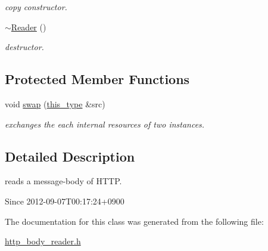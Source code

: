 \begin{DoxyCompactItemize}
\begin{DoxyCompactList}\small\item\em copy constructor. \end{DoxyCompactList}\item 
\hypertarget{classhryky_1_1http_1_1body_1_1_reader_af61ffe0181b1f2c24cec9befcf46b793}{\hyperlink{classhryky_1_1http_1_1body_1_1_reader_af61ffe0181b1f2c24cec9befcf46b793}{$\sim$\-Reader} ()}\label{classhryky_1_1http_1_1body_1_1_reader_af61ffe0181b1f2c24cec9befcf46b793}

\begin{DoxyCompactList}\small\item\em destructor. \end{DoxyCompactList}\end{DoxyCompactItemize}
\subsection*{Protected Member Functions}
\begin{DoxyCompactItemize}
\item 
\hypertarget{classhryky_1_1http_1_1body_1_1_reader_a9c6a58755c47e91cbe61085af6c54144}{void \hyperlink{classhryky_1_1http_1_1body_1_1_reader_a9c6a58755c47e91cbe61085af6c54144}{swap} (\hyperlink{classhryky_1_1http_1_1body_1_1_reader_ab81eae48a1c2e78cf613bffd7180400c}{this\-\_\-type} \&src)}\label{classhryky_1_1http_1_1body_1_1_reader_a9c6a58755c47e91cbe61085af6c54144}

\begin{DoxyCompactList}\small\item\em exchanges the each internal resources of two instances. \end{DoxyCompactList}\end{DoxyCompactItemize}


\subsection{Detailed Description}
reads a message-\/body of H\-T\-T\-P. 

\begin{DoxySince}{Since}
2012-\/09-\/07\-T00\-:17\-:24+0900 
\end{DoxySince}


The documentation for this class was generated from the following file\-:\begin{DoxyCompactItemize}
\item 
\hyperlink{http__body__reader_8h}{http\-\_\-body\-\_\-reader.\-h}\end{DoxyCompactItemize}
